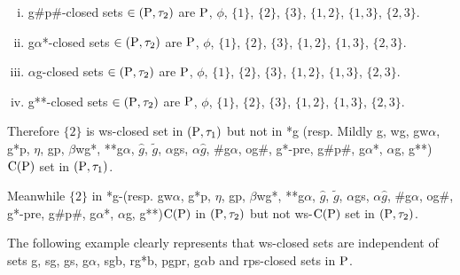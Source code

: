 \begin{exm}
\begin{enumerate}[(i)]
\item g\#p\#-closed sets $\in(\mathrm{P}, \tau_{2})$ are $\mathrm{P}$, $\phi$, $\{1\}$, $\{2\}$, $\{3\}$, $\{1, 2\}$, $\{1, 3\}$, $\{2, 3\}$.
\item g$\alpha$*-closed sets $\in(\mathrm{P}, \tau_{2})$ are $\mathrm{P}$, $\phi$, $\{1\}$, $\{2\}$, $\{3\}$, $\{1, 2\}$, $\{1, 3\}$, $\{2, 3\}$.
\item $\alpha$g-closed sets $\in(\mathrm{P}, \tau_{2})$ are $\mathrm{P}$, $\phi$, $\{1\}$, $\{2\}$, $\{3\}$, $\{1, 2\}$, $\{1, 3\}$, $\{2, 3\}$.
\item g{*}{*}-closed sets $\in(\mathrm{P}, \tau_{2})$ are $\mathrm{P}$, $\phi$, $\{1\}$, $\{2\}$, $\{3\}$, $\{1, 2\}$, $\{1, 3\}$, $\{2, 3\}$.
\end{enumerate}

Therefore $\{2\}$ is ws-closed set in $(\mathrm{P}, \tau_{1})$ but not in *g (resp. Mildly g, wg, gw$\alpha$, g*p, $\eta$, gp, $\beta$wg*, {*}{*}g$\alpha$, $\hat{g}$, $\tilde{g}$, $\alpha$gs, $\alpha\hat{g}$, \#g$\alpha$, og\#, g*-pre, g\#p\#, g$\alpha$*, $\alpha$g, g{*}{*})$\mathrm{C}(\mathrm{P})$ set in $(\mathrm{P},\tau_{1})$.

Meanwhile $\{2\}$ in *g-(resp. gw$\alpha$, g*p, $\eta$, gp, $\beta$wg*, {*}{*}g$\alpha$, $\hat{g}$, $\tilde{g}$, $\alpha$gs, $\alpha\hat{g}$, \#g$\alpha$, og\#, g*-pre, g\#p\#, g$\alpha$*, $\alpha$g, g{*}{*})$\mathrm{C}(\mathrm{P})$ in $(\mathrm{P}, \tau_{2})$ but not ws-$\mathrm{C}(\mathrm{P})$ set in $(\mathrm{P}, \tau_{2})$.
\end{exm}

\begin{rem}\label{rem2.2.18}
The following example clearly represents that ws-closed sets are independent of sets g, sg, gs, g$\alpha$, sgb, rg*b, pgpr, g$\alpha$b and rps-closed sets in $\mathrm{P}$.
\end{rem}

